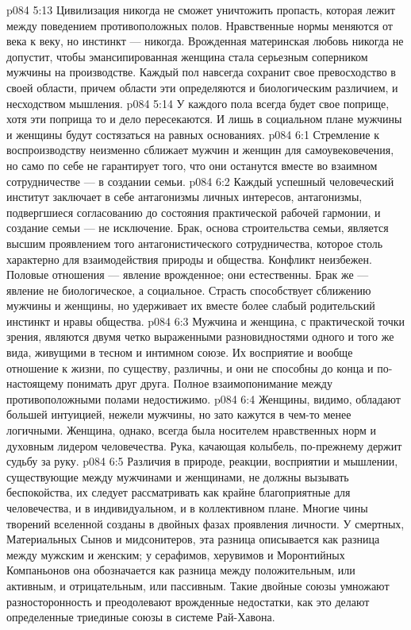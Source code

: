 \vs p084 5:13 Цивилизация никогда не сможет уничтожить пропасть, которая лежит между поведением противоположных полов. Нравственные нормы меняются от века к веку, но инстинкт --- никогда. Врожденная материнская любовь никогда не допустит, чтобы эмансипированная женщина стала серьезным соперником мужчины на производстве. Каждый пол навсегда сохранит свое превосходство в своей области, причем области эти определяются и биологическим различием, и несходством мышления.
\vs p084 5:14 У каждого пола всегда будет свое поприще, хотя эти поприща то и дело пересекаются. И лишь в социальном плане мужчины и женщины будут состязаться на равных основаниях.
\vs p084 6:1 Стремление к воспроизводству неизменно сближает мужчин и женщин для самоувековечения, но само по себе не гарантирует того, что они останутся вместе во взаимном сотрудничестве --- в создании семьи.
\vs p084 6:2 Каждый успешный человеческий институт заключает в себе антагонизмы личных интересов, антагонизмы, подвергшиеся согласованию до состояния практической рабочей гармонии, и создание семьи --- не исключение. Брак, основа строительства семьи, является высшим проявлением того антагонистического сотрудничества, которое столь характерно для взаимодействия природы и общества. Конфликт неизбежен. Половые отношения --- явление врожденное; они естественны. Брак же --- явление не биологическое, а социальное. Страсть способствует сближению мужчины и женщины, но удерживает их вместе более слабый родительский инстинкт и нравы общества.
\vs p084 6:3 \pc Мужчина и женщина, с практической точки зрения, являются двумя четко выраженными разновидностями одного и того же вида, живущими в тесном и интимном союзе. Их восприятие и вообще отношение к жизни, по существу, различны, и они не способны до конца и по\hyp{}настоящему понимать друг друга. Полное взаимопонимание между противоположными полами недостижимо.
\vs p084 6:4 Женщины, видимо, обладают большей интуицией, нежели мужчины, но зато кажутся в чем\hyp{}то менее логичными. Женщина, однако, всегда была носителем нравственных норм и духовным лидером человечества. Рука, качающая колыбель, по\hyp{}прежнему держит судьбу за руку.
\vs p084 6:5 \pc Различия в природе, реакции, восприятии и мышлении, существующие между мужчинами и женщинами, не должны вызывать беспокойства, их следует рассматривать как крайне благоприятные для человечества, и в индивидуальном, и в коллективном плане. Многие чины творений вселенной созданы в двойных фазах проявления личности. У смертных, Материальных Сынов и мидсонитеров, эта разница описывается как разница между мужским и женским; у серафимов, херувимов и Моронтийных Компаньонов она обозначается как разница между положительным, или активным, и отрицательным, или пассивным. Такие двойные союзы умножают разносторонность и преодолевают врожденные недостатки, как это делают определенные триединые союзы в системе Рай\hyp{}Хавона.
